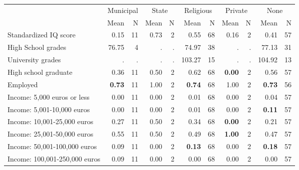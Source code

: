\begin{tabular}{l r r r r r r r r r r}
\toprule
& \multicolumn{2}{c}{Municipal} & \multicolumn{2}{c}{State} & \multicolumn{2}{c}{Religious} & \multicolumn{2}{c}{Private} & \multicolumn{2}{c}{None} \\
& \scriptsize Mean & \scriptsize N & \scriptsize Mean & \scriptsize N & \scriptsize Mean & \scriptsize N & \scriptsize Mean & \scriptsize N & \scriptsize Mean & \scriptsize N \\
\midrule
Standardized IQ score &      0.15 &        11 &      0.73 &         2 &      0.55 &        68 &      0.16 &         2 &      0.41 &        57 \\
High School grades &     76.75 &         4 &         . & . &     74.97 &        38 &         . & . &     77.13 &        31 \\
University grades &         . & . &         . & . &    103.27 &        15 &         . & . &    104.92 &        13 \\
High school graduate &      0.36 &        11 &      0.50 &         2 &      0.62 &        68 & \textbf{     0.00} &         2 &      0.56 &        57 \\
Employed & \textbf{     0.73} &        11 &      1.00 &         2 & \textbf{     0.74} &        68 &      1.00 &         2 & \textbf{     0.73} &        56 \\
Income: 5,000 euros or less &      0.00 &        11 &      0.00 &         2 &      0.01 &        68 &      0.00 &         2 &      0.04 &        57 \\
Income: 5,001-10,000 euros &      0.00 &        11 &      0.00 &         2 &      0.01 &        68 &      0.00 &         2 & \textbf{     0.11} &        57 \\
Income: 10,001-25,000 euros &      0.27 &        11 &      0.50 &         2 &      0.34 &        68 & \textbf{     0.00} &         2 &      0.21 &        57 \\
Income: 25,001-50,000 euros &      0.55 &        11 &      0.50 &         2 &      0.49 &        68 & \textbf{     1.00} &         2 &      0.47 &        57 \\
Income: 50,001-100,000 euros &      0.09 &        11 &      0.00 &         2 & \textbf{     0.13} &        68 &      0.00 &         2 & \textbf{     0.18} &        57 \\
Income: 100,001-250,000 euros &      0.09 &        11 &      0.00 &         2 &      0.00 &        68 &      0.00 &         2 &      0.00 &        57 \\

\end{tabular}
